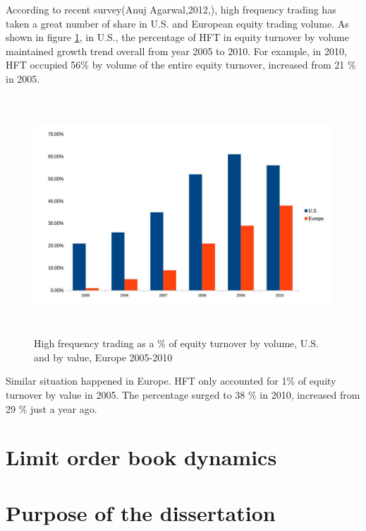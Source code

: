 According to recent survey(Anuj Agarwal,2012,\cite{hft_future}), high frequency trading has taken a great number of share in U.S. and European equity trading volume. As shown in figure \ref{fig.1}, in U.S., the percentage of HFT in equity turnover by volume maintained growth trend overall from year 2005 to 2010. For example, in 2010, HFT occupied 56\% by volume of the entire equity turnover, increased from 21 \% in 2005. 

\begin{figure}[hbtp]
  \begin{center}
    \includegraphics[width=6.5in,height=3.5in]{figures/hft_percentage.jpg}
  \end{center}
\caption{High frequency trading as a \% of equity turnover by volume, U.S. and by value, Europe 2005-2010} \label{fig.1}
\end{figure}

Similar situation happened in Europe. HFT only accounted for 1\% of equity turnover by value in 2005. The percentage surged to 38 \% in 2010, increased from 29 \% just a year ago.

\section{Limit order book dynamics}

\section{Purpose of the dissertation}